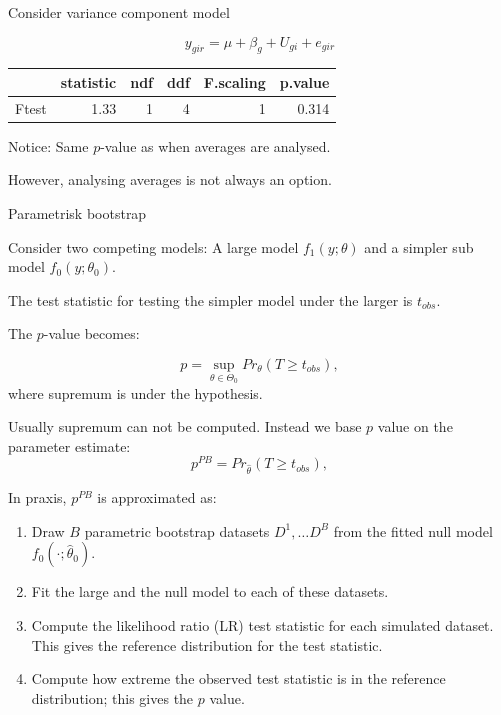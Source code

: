 \documentclass[
  ignorenonframetext,
]{beamer}
\begin{document}
\begin{frame}

Consider variance component model

\[
y_{gir} = \mu + \beta_g + U_{gi} + e_{gir}
\]

\small

\begin{table}[!h]
\centering
\begin{tabular}{lrrrrr}
\toprule
  & statistic & ndf & ddf & F.scaling & p.value\\
\midrule
Ftest & 1.33 & 1 & 4 & 1 & 0.314\\
\bottomrule
\end{tabular}
\end{table}

\normalsize

Notice: Same \(p\)-value as when averages are analysed.

However, analysing averages is not always an option.

\end{frame}

\begin{frame}

\begin{block}{Parametrisk bootstrap}

Consider two competing models: A large model \(f_1(y; \theta)\) and a
simpler sub model \(f_0(y; \theta_0)\).

The test statistic for testing the simpler model under the larger is
\(t_{obs}\).

The \(p\)-value becomes:

\[
 p = \sup_{\theta \in \Theta_0} Pr_{\theta}(T \ge t_{obs}),
\] where supremum is under the hypothesis.

Usually supremum can not be computed. Instead we base \(p\) value on the
parameter estimate: \[
 p^{PB} = Pr_{\hat\theta}(T \ge t_{obs}),
\]

\end{block}

\end{frame}

\begin{frame}

In praxis, \(p^{PB}\) is approximated as:

\begin{enumerate}
\item
  Draw \(B\) parametric bootstrap datasets \(D^1, \dots D^B\) from the
  fitted null model \(f_0(\cdot; \hat \theta_0)\).
\item
  Fit the large and the null model to each of these datasets.
\item
  Compute the likelihood ratio (LR) test statistic for each simulated
  dataset. This gives the reference distribution for the test statistic.
\item
  Compute how extreme the observed test statistic is in the reference
  distribution; this gives the \(p\) value.
\end{enumerate}

\end{frame}
\end{document}
